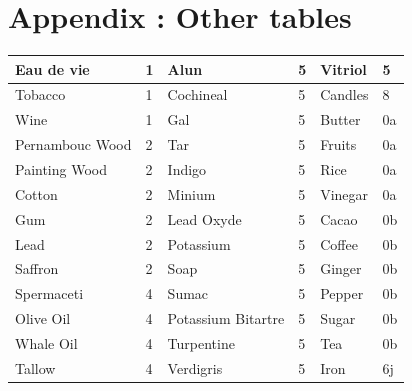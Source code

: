 \documentclass[12pt,a4paper,titlepage]{article}
\begin{document}
\section{Appendix : Other tables}
\begin{center}

\begin{tabular}{ | l | l | l | l | l | l | }
\hline
	Eau de vie & 1 & Alun & 5 & Vitriol & 5 \\ \hline
	Tobacco & 1 & Cochineal & 5 & Candles & 8 \\ \hline
	Wine & 1 & Gal & 5 & Butter & 0a \\ \hline
	Pernambouc Wood & 2 & Tar & 5 & Fruits & 0a \\ \hline
	Painting Wood & 2 & Indigo & 5 & Rice & 0a \\ \hline
	Cotton & 2 & Minium  & 5 & Vinegar & 0a \\ \hline
	Gum & 2 & Lead Oxyde & 5 & Cacao & 0b \\ \hline
	Lead & 2 & Potassium & 5 & Coffee & 0b \\ \hline
	Saffron & 2 & Soap & 5 & Ginger & 0b \\ \hline
	Spermaceti & 4 & Sumac & 5 & Pepper & 0b \\ \hline
	Olive Oil & 4 & Potassium Bitartre & 5 & Sugar & 0b \\ \hline
	Whale Oil & 4 & Turpentine & 5 & Tea & 0b \\ \hline
	Tallow & 4 & Verdigris & 5 & Iron & 6j \\ \hline
\end{tabular}
\end{center}
\end{document}
